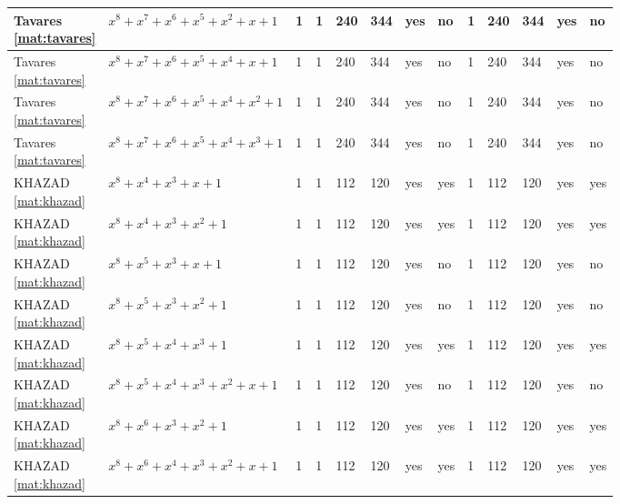 \begin{tiny}
\begin{longtable}{|l|l|l|l|l|l|l|l|l|l|l|l|l|}
\shortstack{Tavares \\ \eqref{mat:tavares}} & $x^8 + x^7 + x^6 + x^5 + x^2 + x + 1$ & 1 & 1 & 240 & 344 & yes & no & 1 & 240 & 344 & yes & no \\ \hline
\shortstack{Tavares \\ \eqref{mat:tavares}} & $x^8 + x^7 + x^6 + x^5 + x^4 + x + 1$ & 1 & 1 & 240 & 344 & yes & no & 1 & 240 & 344 & yes & no \\ \hline
\shortstack{Tavares \\ \eqref{mat:tavares}} & $x^8 + x^7 + x^6 + x^5 + x^4 + x^2 + 1$ & 1 & 1 & 240 & 344 & yes & no & 1 & 240 & 344 & yes & no \\ \hline
\shortstack{Tavares \\ \eqref{mat:tavares}} & $x^8 + x^7 + x^6 + x^5 + x^4 + x^3 + 1$ & 1 & 1 & 240 & 344 & yes & no & 1 & 240 & 344 & yes & no \\ \hline
\shortstack{KHAZAD \\ \eqref{mat:khazad}} & $x^8 + x^4 + x^3 + x + 1$ & 1 & 1 & 112 & 120 & yes & yes & 1 & 112 & 120 & yes & yes \\ \hline
\shortstack{KHAZAD \\ \eqref{mat:khazad}} & $x^8 + x^4 + x^3 + x^2 + 1$ & 1 & 1 & 112 & 120 & yes & yes & 1 & 112 & 120 & yes & yes \\ \hline
\shortstack{KHAZAD \\ \eqref{mat:khazad}} & $x^8 + x^5 + x^3 + x + 1$ & 1 & 1 & 112 & 120 & yes & no & 1 & 112 & 120 & yes & no \\ \hline
\shortstack{KHAZAD \\ \eqref{mat:khazad}} & $x^8 + x^5 + x^3 + x^2 + 1$ & 1 & 1 & 112 & 120 & yes & no & 1 & 112 & 120 & yes & no \\ \hline
\shortstack{KHAZAD \\ \eqref{mat:khazad}} & $x^8 + x^5 + x^4 + x^3 + 1$ & 1 & 1 & 112 & 120 & yes & yes & 1 & 112 & 120 & yes & yes \\ \hline
\shortstack{KHAZAD \\ \eqref{mat:khazad}} & $x^8 + x^5 + x^4 + x^3 + x^2 + x + 1$ & 1 & 1 & 112 & 120 & yes & no & 1 & 112 & 120 & yes & no \\ \hline
\shortstack{KHAZAD \\ \eqref{mat:khazad}} & $x^8 + x^6 + x^3 + x^2 + 1$ & 1 & 1 & 112 & 120 & yes & yes & 1 & 112 & 120 & yes & yes \\ \hline
\shortstack{KHAZAD \\ \eqref{mat:khazad}} & $x^8 + x^6 + x^4 + x^3 + x^2 + x + 1$ & 1 & 1 & 112 & 120 & yes & yes & 1 & 112 & 120 & yes & yes \\ \hline

\end{longtable}
\end{tiny}
